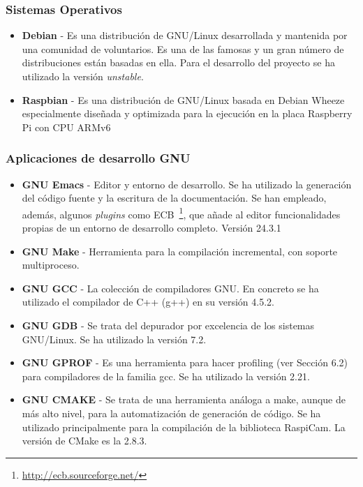 \subsubsection{Sistemas Operativos}
\begin{itemize}
\item \textbf{Debian} - Es una distribución de GNU/Linux desarrollada y mantenida por una comunidad de voluntarios. Es una de las famosas y un gran número de distribuciones están basadas en ella. Para el desarrollo del proyecto se ha utilizado la versión \emph{unstable}. 

\item \textbf{Raspbian} - Es una distribución de GNU/Linux basada en Debian Wheeze especialmente diseñada y optimizada para la ejecución en la placa Raspberry Pi con  CPU ARMv6   
\end{itemize}

\subsubsection{Aplicaciones de desarrollo GNU}
\begin{itemize}
\item \textbf{GNU Emacs} - Editor y entorno de desarrollo. Se ha utilizado la generación del código fuente y la escritura de la documentación.  Se han empleado, además, algunos \textit{plugins} como
  ECB~\footnote{\url{http://ecb.sourceforge.net/}}, que añade al editor funcionalidades propias de un entorno
  de desarrollo completo. Versión 24.3.1
\item \textbf{GNU Make} - Herramienta para la compilación incremental, con soporte multiproceso.
\item \textbf{GNU GCC} - La colección de compiladores GNU. En concreto se ha utilizado el compilador de C++ (g++) en su versión 4.5.2.
\item \textbf{GNU GDB} - Se trata del depurador por excelencia de los sistemas GNU/Linux. Se ha utilizado la versión 7.2.
\item \textbf{GNU GPROF} - Es una herramienta para hacer profiling (ver Sección 6.2) para compiladores de la familia gcc. Se ha utilizado la versión 2.21.
\item \textbf{GNU CMAKE} - Se trata de una herramienta análoga a make, aunque de más alto nivel, para la automatización de generación de código. Se ha utilizado principalmente para la compilación de la biblioteca RaspiCam. La versión de CMake es la 2.8.3. 
\end{itemize}


